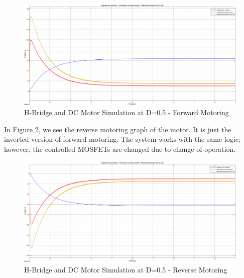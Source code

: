 \begin{figure}[ht]
    \centering
    \includegraphics[width=1\textwidth]{matlab/forward motoring D50_900W.png}
    \caption{H-Bridge and DC Motor Simulation at D=0.5 - Forward Motoring}
    \label{fig:forward_mot}
\end{figure}

In Figure \ref{fig:rev_mot}, we see the reverse motoring graph of the motor. It is just the inverted version of forward motoring. The system works with the same logic; however, the controlled MOSFETs are changed due to change of operation. 
\begin{figure}[ht]
    \centering
    \includegraphics[width=1\textwidth]{matlab/reverse motoring D50_ 900W.png}
    \caption{H-Bridge and DC Motor Simulation at D=0.5 - Reverse Motoring}
    \label{fig:rev_mot}
\end{figure}

